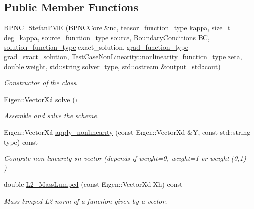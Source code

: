 \subsection*{Public Member Functions}
\begin{DoxyCompactItemize}
\item 
\hyperlink{group__BPNC_ga85e80578aa553215feae11284549b354}{B\+P\+N\+C\+\_\+\+Stefan\+P\+ME} (\hyperlink{classHArDCore2D_1_1BPNCCore}{B\+P\+N\+C\+Core} \&nc, \hyperlink{classHArDCore2D_1_1BPNC__StefanPME_aa07717e39892228c331b3cf3c29b086e}{tensor\+\_\+function\+\_\+type} kappa, size\+\_\+t deg\+\_\+kappa, \hyperlink{classHArDCore2D_1_1BPNC__StefanPME_a233ff438d25c93b72498ce3b461c8623}{source\+\_\+function\+\_\+type} source, \hyperlink{classBoundaryConditions}{Boundary\+Conditions} BC, \hyperlink{classHArDCore2D_1_1BPNC__StefanPME_ad0802f467317597f803c0dd45d26c3ba}{solution\+\_\+function\+\_\+type} exact\+\_\+solution, \hyperlink{classHArDCore2D_1_1BPNC__StefanPME_a33d159dc2e762c21926b85a21e38c5d8}{grad\+\_\+function\+\_\+type} grad\+\_\+exact\+\_\+solution, \hyperlink{classTestCaseNonLinearity_a3d8a5c89c517dd0d9c835b7441ee9b07}{Test\+Case\+Non\+Linearity\+::nonlinearity\+\_\+function\+\_\+type} zeta, double weight, std\+::string solver\+\_\+type, std\+::ostream \&output=std\+::cout)
\begin{DoxyCompactList}\small\item\em Constructor of the class. \end{DoxyCompactList}\item 
Eigen\+::\+Vector\+Xd \hyperlink{group__BPNC_ga8729ab99cd04c0ef4c6b2556805d1e8d}{solve} ()
\begin{DoxyCompactList}\small\item\em Assemble and solve the scheme. \end{DoxyCompactList}\item 
Eigen\+::\+Vector\+Xd \hyperlink{group__BPNC_ga1d2805e0b077ec85e8530cf5e2b11be5}{apply\+\_\+nonlinearity} (const Eigen\+::\+Vector\+Xd \&Y, const std\+::string type) const
\begin{DoxyCompactList}\small\item\em Compute non-\/linearity on vector (depends if weight=0, weight=1 or weight (0,1) ) \end{DoxyCompactList}\item 
double \hyperlink{group__BPNC_ga54ab7a35ac7ccb83fc678aee96eb5dc3}{L2\+\_\+\+Mass\+Lumped} (const Eigen\+::\+Vector\+Xd Xh) const
\begin{DoxyCompactList}\small\item\em Mass-\/lumped L2 norm of a function given by a vector. \end{DoxyCompactList}\item 

\end{DoxyCompactItemize}
